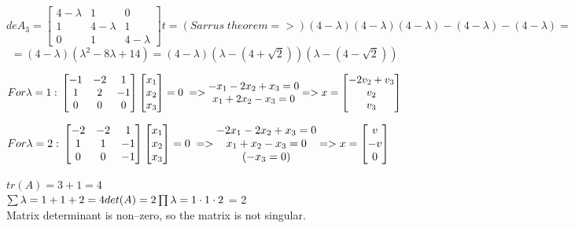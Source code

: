 \documentclass[eng,openany]{mgr}
\begin{document}
\[
de
A_3 =
\begin{bmatrix}
4-\lambda & 1 & 0  \\
1 & 4-\lambda & 1 \\
0 & 1 & 4-\lambda 
\end{bmatrix}t
= (Sarrus\;theorem =>)(4-\lambda)(4-\lambda)(4-\lambda)- (4-\lambda) - (4-\lambda) = 
\]
\[
= (4-\lambda)(\lambda^2 - 8 \lambda + 14) = (4-\lambda)(\lambda - (4+\sqrt{2}))(\lambda - (4-\sqrt{2}))
\]

\begin{math}
For \lambda = 1:\\
\begin{bmatrix}
-1 & -2 & 1  \\
1 & 2 & -1 \\
0 & 0 & 0 
\end{bmatrix}
\begin{bmatrix}
x_1 \\
x_2 \\
x_3
\end{bmatrix}
= 0\; =>
\begin{matrix}
-x_1 -2x_2+x_3 = 0\\
x_1+2x_2-x_3 = 0\\

\end{matrix}
=>
x = 
\begin{bmatrix}
-2v_2+v_3\\
v_2 \\
v_3
\end{bmatrix}
\end{math}

\begin{math}
For \lambda = 2:\\
\begin{bmatrix}
-2 & -2 & 1  \\
1 & 1 & -1 \\
0 & 0 & -1 
\end{bmatrix}
\begin{bmatrix}
x_1 \\
x_2 \\
x_3
\end{bmatrix}
= 0\; =>
\begin{matrix}
-2x_1 -2x_2+x_3 = 0\\
x_1+x_2-x_3 = 0\\
(-x_3=0)
\end{matrix}
=>
x = 
\begin{bmatrix}
v\\
-v \\
0
\end{bmatrix}
\end{math}
\\ \\ 
$tr(A) = 3 +1 = 4$\\
$\sum \lambda = 1+1+2 = 4
\\ \\
det(A) = 2\\
\prod \lambda = 1 \cdot 1 \cdot 2$ = 2
\\
Matrix determinant is non--zero, so the matrix is not singular.
\end{document}

